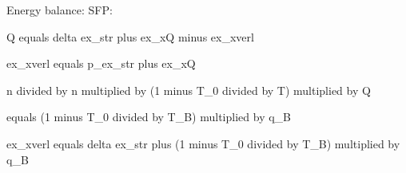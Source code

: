 Energy balance: SFP:  

Q equals delta ex_str plus ex_xQ minus ex_xverl  

ex_xverl equals p_ex_str plus ex_xQ  

n divided by n multiplied by (1 minus T_0 divided by T) multiplied by Q  

equals (1 minus T_0 divided by T_B) multiplied by q_B  

ex_xverl equals delta ex_str plus (1 minus T_0 divided by T_B) multiplied by q_B
